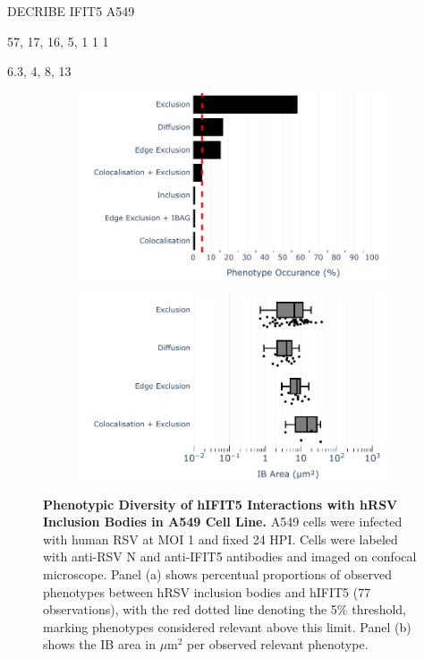 DECRIBE IFIT5 A549

57, 17, 16, 5, 1 1 1

6.3, 4, 8, 13

\begin{figure}
    \begin{subfigure}{0.495\textwidth}
        \caption{}
        \includegraphics[width=1\linewidth]{08. Chapter 3/Figs/02. Infection/04. IFIT5/01. bar_i5_a549.pdf} 
    \end{subfigure}
    \begin{subfigure}{0.495\textwidth}
        \caption{}
        \includegraphics[width=1\linewidth]{08. Chapter 3/Figs/02. Infection/04. IFIT5/02. box_i5_a549.pdf}
    \end{subfigure}
    \caption[Phenotypic Diversity of hIFIT5 Interactions with hRSV Inclusion Bodies in A549 Cell Line.]{\textbf{Phenotypic Diversity of hIFIT5 Interactions with hRSV Inclusion Bodies in A549 Cell Line.} A549 cells were infected with human RSV at MOI 1 and fixed 24 HPI. Cells were labeled with anti-RSV N and anti-IFIT5 antibodies and imaged on confocal microscope. Panel (a) shows percentual proportions of observed phenotypes between hRSV inclusion bodies and hIFIT5 (77 observations), with the red dotted line denoting the 5\% threshold, marking phenotypes considered relevant above this limit. Panel (b) shows the IB area in \(\mu \mbox{m}^2\) per observed relevant phenotype.}
    \label{fig:Phenotypic Diversity of hIFIT5 Interactions with hRSV Inclusion Bodies in A549 Cell Line}
\end{figure}

